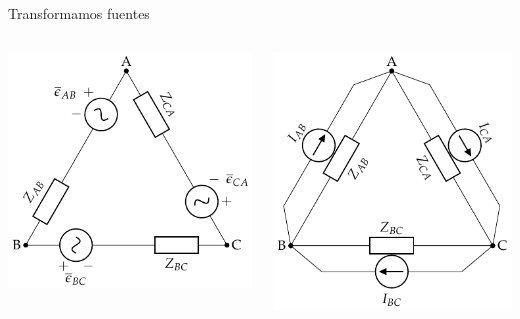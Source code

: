 \documentclass[aspectratio=169, usenames,svgnames,dvipsnames]{beamer}
\begin{document}
\begin{frame}[label={sec:org7efb820}]{Transformamos fuentes}
\begin{columns}
\begin{column}{0.4\columnwidth}
\begin{center}
\includegraphics[width=\textwidth]{../figs/GeneradorRealTriangulo.pdf}
\end{center}
\end{column}
\begin{column}{0.4\columnwidth}
\begin{center}
\includegraphics[width=\textwidth]{../figs/GeneradorRealTriangulo_I.pdf}

\end{center}
\end{column}
\end{columns}
\end{frame}
\end{document}
